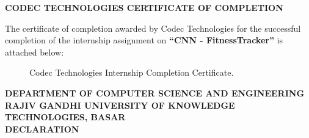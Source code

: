 \documentclass[12pt,a4paper]{report}
\begin{document}
\newpage
\begin{center}
{\Large\bfseries CODEC TECHNOLOGIES CERTIFICATE OF COMPLETION} \\[1.0cm]
\end{center}

The certificate of completion awarded by Codec Technologies for the successful completion of the internship assignment on \textbf{``CNN - FitnessTracker''} is attached below: \\[1.0cm]

\begin{figure}[h]
\centering

\caption{Codec Technologies Internship Completion Certificate.}
\label{fig:codec_completion_certificate}
\end{figure}

\newpage
\begin{center}
{\large\bfseries DEPARTMENT OF COMPUTER SCIENCE AND ENGINEERING} \\[0.15cm]
{\large\bfseries RAJIV GANDHI UNIVERSITY OF KNOWLEDGE TECHNOLOGIES, BASAR} \\[1.5cm]
{\Large\bfseries DECLARATION} \\[1.5cm]
\end{center}
\end{document}

